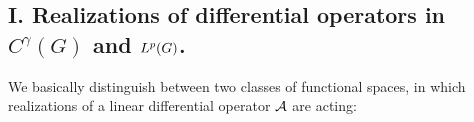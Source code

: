 \documentclass[11pt,twoside]{article}
\def\G{G}
\begin{document}
\def\TITLEA{Realizations of differential operators in $C^{\gamma}(\G)$ and $\Lp$.}
\def\TITLEB{The closeness of strongly elliptic Dirichlet operators.}
\def\TITLEC{Formally adjoint expressions and adjointness theorems.}
\def\TITLED{{\GARDING}'s inequality and quasi-coercive Dirichlet forms.}
\def\TITLEE{Weak solutions of boundary and initial-boundary value problems.}
\def\TITLEF{The Fredholm property of elliptic operators.}
\def\TITLEG{Spectral theory and sectorialness of strongly elliptic operators.}
\def\TITLEH{Self-adjoint extensions of half-bounded operators.}

\subsection*{I. {\TITLEA}}
We basically distinguish between two classes of functional spaces,
in which realizations of a linear differential operator ${\mathcal{A}}$ are acting:
\end{document}
